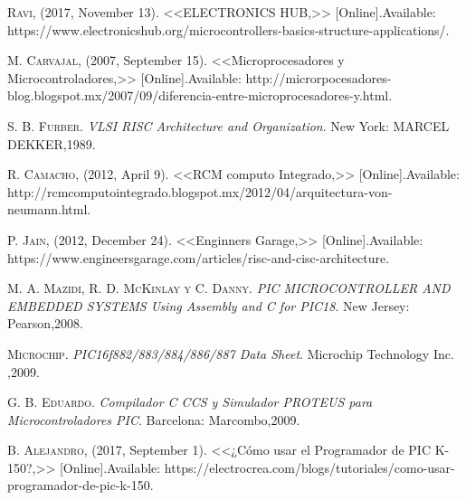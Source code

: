 \documentclass[12pt,a4paper]{article}
\begin{document}
   \begin{thebibliography}{10}
     \textsc{Ravi}, (2017, November 13). <<ELECTRONICS HUB,>> [Online].Available: https://www.electronicshub.org/microcontrollers-basics-structure-applications/.
     
     \textsc{M. Carvajal}, (2007, September 15). <<Microprocesadores y Microcontroladores,>> [Online].Available: http://microrpocesadores-blog.blogspot.mx/2007/09/diferencia-entre-microprocesadores-y.html.
     
     \textsc{S. B. Furber}. \textit{VLSI RISC Architecture and Organization}. New York: MARCEL DEKKER,1989.
     
     \textsc{R. Camacho}, (2012, April 9). <<RCM computo Integrado,>> [Online].Available: http://rcmcomputointegrado.blogspot.mx/2012/04/arquitectura-von-neumann.html.
     
     \textsc{P. Jain}, (2012, December 24). <<Enginners Garage,>> [Online].Available: https://www.engineersgarage.com/articles/risc-and-cisc-architecture.
     
      \textsc{M. A. Mazidi, R. D. McKinlay y C. Danny}. \textit{PIC MICROCONTROLLER AND EMBEDDED SYSTEMS Using Assembly and C for PIC18}. New Jersey: Pearson,2008.
      
      \textsc{Microchip}. \textit{PIC16f882/883/884/886/887 Data Sheet}. Microchip Technology Inc. ,2009.
      
      \textsc{G. B. Eduardo}. \textit{Compilador C CCS y Simulador PROTEUS para Microcontroladores PIC}. Barcelona: Marcombo,2009.
      
       \textsc{B. Alejandro}, (2017, September 1). <<¿Cómo usar el Programador de PIC K-150?,>> [Online].Available: https://electrocrea.com/blogs/tutoriales/como-usar-programador-de-pic-k-150.
      
    \end{thebibliography}
\end{document}
